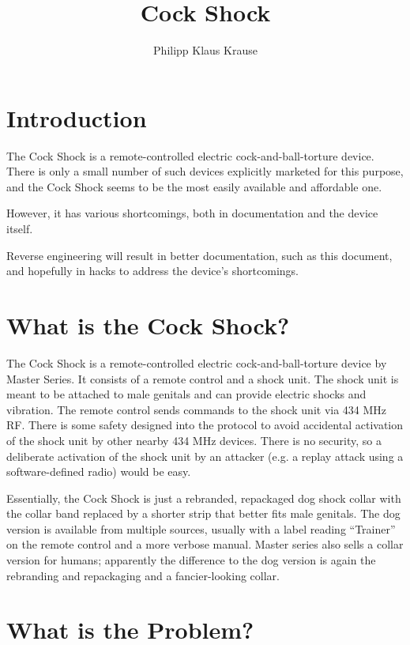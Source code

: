 \documentclass[a4paper]{article}
\begin{document}
\title{Cock Shock}
\author{Philipp Klaus Krause}

\maketitle

\section{Introduction}

The Cock Shock is a remote-controlled electric cock-and-ball-torture device. There is only a small number of such devices explicitly marketed for this purpose, and the Cock Shock seems to be the most easily available and affordable one.

However, it has various shortcomings, both in documentation and the device itself.

Reverse engineering will result in better documentation, such as this document, and hopefully in hacks to address the device's shortcomings.

\section{What is the Cock Shock?}

The Cock Shock is a remote-controlled electric cock-and-ball-torture device by Master Series. It consists of a remote control and a shock unit. The shock unit is meant to be attached to male genitals and can provide electric shocks and vibration. The remote control sends commands to the shock unit via 434 MHz RF. There is some safety designed into the protocol to avoid accidental activation of the shock unit by other nearby 434 MHz devices. There is no security, so a deliberate activation of the shock unit by an attacker (e.g. a replay attack using a software-defined radio) would be easy.

Essentially, the Cock Shock is just a rebranded, repackaged dog shock collar with the collar band replaced by a shorter strip that better fits male genitals. The dog version is available from multiple sources, usually with a label reading ``Trainer'' on the remote control and a more verbose manual. Master series also sells a collar version for humans; apparently the difference to the dog version is again the rebranding and repackaging and a fancier-looking collar.

\section{What is the Problem?}
\end{document}
